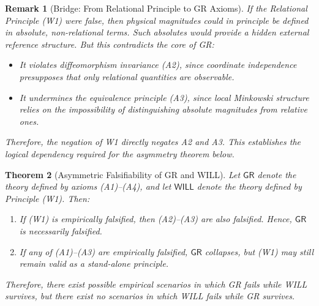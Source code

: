 \documentclass[12pt, a4paper]{article}
\newtheorem{theorem}{Theorem}[section]
\newtheorem{remark}[theorem]{Remark}
\begin{document}
\begin{remark}[Bridge: From Relational Principle to GR Axioms]
If the Relational Principle (W1) were false, then physical magnitudes
could in principle be defined in absolute, non-relational terms. 
Such absolutes would provide a hidden external reference structure.
But this contradicts the core of GR:
\begin{itemize}
    \item It violates diffeomorphism invariance (A2), since coordinate independence
    presupposes that only relational quantities are observable.
    \item It undermines the equivalence principle (A3), since local Minkowski structure 
    relies on the impossibility of distinguishing absolute magnitudes from relative ones.
\end{itemize}
Therefore, the negation of W1 directly negates A2 and A3. 
This establishes the logical dependency required for the asymmetry theorem below.
\end{remark}

\begin{theorem}[Asymmetric Falsifiability of GR and WILL]
\label{thm:asymmetry}
Let $\mathsf{GR}$ denote the theory defined by axioms (A1)--(A4),
and let $\mathsf{WILL}$ denote the theory defined by Principle (W1).
Then:
\begin{enumerate}
    \item If (W1) is empirically falsified, then (A2)--(A3) are also falsified. 
    Hence, $\mathsf{GR}$ is necessarily falsified.
    \item If any of (A1)--(A3) are empirically falsified, $\mathsf{GR}$ collapses,
    but (W1) may still remain valid as a stand-alone principle.
\end{enumerate}
Therefore, there exist possible empirical scenarios in which GR fails
while WILL survives, but there exist no scenarios in which WILL fails
while GR survives.
\end{theorem}
\end{document}
